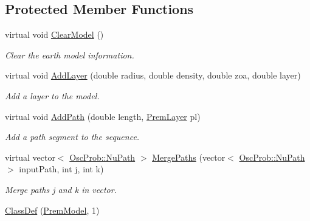 \subsection*{Protected Member Functions}
\begin{DoxyCompactItemize}
\item 
virtual void \hyperlink{classOscProb_1_1PremModel_aaead53a9385bda9b0219fd051d0cdd11}{Clear\+Model} ()
\begin{DoxyCompactList}\small\item\em Clear the earth model information. \end{DoxyCompactList}\item 
virtual void \hyperlink{classOscProb_1_1PremModel_a08c337b84138adc46ee4dd002e9262d2}{Add\+Layer} (double radius, double density, double zoa, double layer)
\begin{DoxyCompactList}\small\item\em Add a layer to the model. \end{DoxyCompactList}\item 
virtual void \hyperlink{classOscProb_1_1PremModel_aca013f7ac5494282834048786a0e07a6}{Add\+Path} (double length, \hyperlink{structOscProb_1_1PremLayer}{Prem\+Layer} pl)
\begin{DoxyCompactList}\small\item\em Add a path segment to the sequence. \end{DoxyCompactList}\item 
virtual vector$<$ \hyperlink{structOscProb_1_1NuPath}{Osc\+Prob\+::\+Nu\+Path} $>$ \hyperlink{classOscProb_1_1PremModel_aa4b392f4d9a87296eadf1ddb34da7f4a}{Merge\+Paths} (vector$<$ \hyperlink{structOscProb_1_1NuPath}{Osc\+Prob\+::\+Nu\+Path} $>$ input\+Path, int j, int k)
\begin{DoxyCompactList}\small\item\em Merge paths j and k in vector. \end{DoxyCompactList}\item 
\hyperlink{classOscProb_1_1PremModel_a9a1d78e29217bb0dd00ae3bd96d22b69}{Class\+Def} (\hyperlink{classOscProb_1_1PremModel}{Prem\+Model}, 1)
\end{DoxyCompactItemize}
